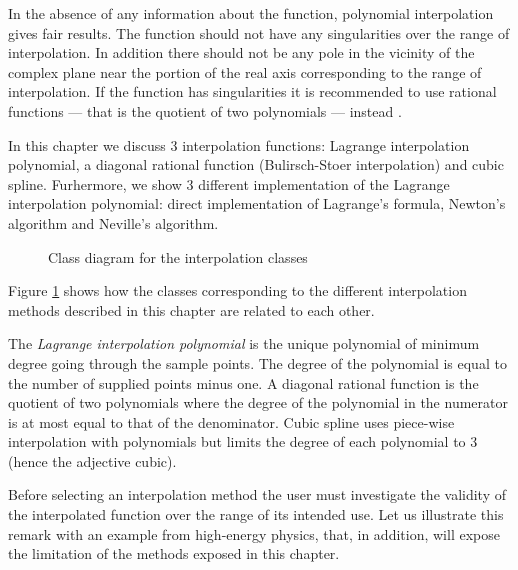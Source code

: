 \documentclass[twoside]{book}
\begin{document}
In the absence of any information about the function, polynomial
interpolation gives fair results. The function should not have any
singularities over the range of interpolation. In addition there
should not be any pole in the vicinity of the complex plane near
the portion of the real axis corresponding to the range of
interpolation. If the function has singularities it is recommended
to use rational functions --- that is the quotient of two
polynomials --- instead \cite{Press}.

In this chapter we discuss 3 interpolation functions: Lagrange
interpolation polynomial, a diagonal rational function
(Bulirsch-Stoer interpolation) and cubic spline. Furhermore, we
show 3 different implementation of the Lagrange interpolation
polynomial: direct implementation of Lagrange's formula, Newton's
algorithm and Neville's algorithm.
\begin{figure}
\label{cls:interpolation}
\center{} \caption{Class diagram for the interpolation classes}
\end{figure}
Figure \ref{cls:interpolation} shows how the classes corresponding
to the different interpolation methods described in this chapter
are related to each other.

 The {\it Lagrange interpolation polynomial}
is the unique polynomial of minimum degree going through the
sample points. The degree of the polynomial is equal to the number
of supplied points minus one. A diagonal rational function is the
quotient of two polynomials where the degree of the polynomial in
the numerator is at most equal to that of the denominator. Cubic
spline uses piece-wise interpolation with polynomials but limits
the degree of each polynomial to 3 (hence the adjective cubic).

 Before selecting an interpolation method the
user must investigate the validity of the interpolated function
over the range of its intended use. Let us illustrate this remark
with an example from high-energy physics, that, in addition, will
expose the limitation of the methods exposed in this chapter.
\end{document}
